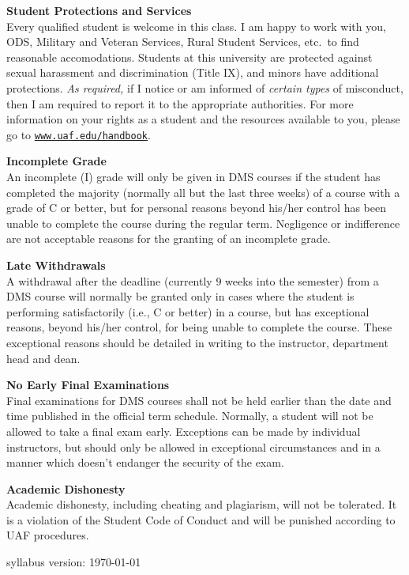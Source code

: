 \documentclass[12pt]{article}
\renewcommand{\emph}[1]{\textsf{\textbf{#1}}}
\newcommand{\localhead}[1]{\par\smallskip\textbf{#1}\nobreak\\}%
\def\heading#1{\localhead{\large\emph{#1}}}
\def\subheading#1{\localhead{\emph{#1}}}
\begin{document}
\subheading{Student Protections and Services}
Every qualified student is welcome in this class.  I am happy to work with you, ODS, Military and Veteran Services, Rural Student Services, etc.~to find reasonable accomodations.  Students at this university are protected against sexual harassment and discrimination (Title IX), and minors have additional protections. \textit{As required,} if I notice or am informed of \textit{certain types} of misconduct, then I am required to report it to the appropriate authorities.  For more information on your rights as a student and the resources available to you, please go to \href{https://www.uaf.edu/handbook/}{\texttt{www.uaf.edu/handbook}}.

\subheading{Incomplete Grade} 
An incomplete (I) grade will only be given in DMS courses if the student has completed the majority (normally all but the last three weeks) of a course with a grade of C or better, but for personal reasons beyond his/her control has been unable to complete the course during the regular term. Negligence or indifference are not acceptable reasons for the granting of an incomplete grade. 

\subheading{Late Withdrawals} 
A withdrawal after the deadline (currently 9 weeks into the semester) from a DMS course will normally be granted only in cases where the student is performing satisfactorily (i.e., C or better) in a course, but has exceptional reasons, beyond his/her control, for being unable to complete the course. These exceptional reasons should be detailed in writing to the instructor, department head and dean.

\subheading{No Early Final Examinations}
Final examinations for DMS courses shall not be held earlier than the date and time published in the official term schedule. Normally, a student will not be allowed to take a final exam early. Exceptions can be made by individual instructors, but should only be allowed in exceptional circumstances and in a manner which doesn't endanger the security of the exam.

\subheading{Academic Dishonesty}
Academic dishonesty, including cheating and plagiarism, will not be tolerated.  It is a violation of the Student Code of Conduct and will be punished according to UAF procedures.

\vfill
\hfill \scriptsize syllabus version: \today \normalsize

\end{document}
